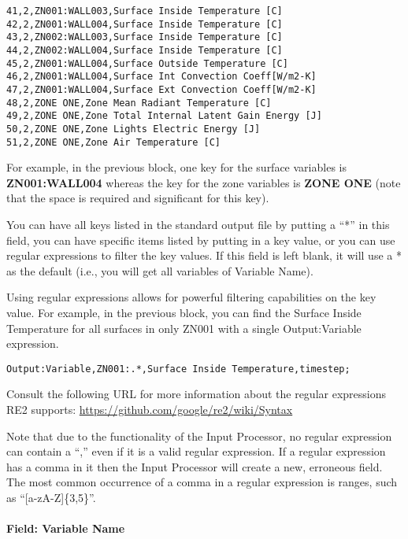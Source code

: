 \begin{lstlisting}
41,2,ZN001:WALL003,Surface Inside Temperature [C]
42,2,ZN001:WALL004,Surface Inside Temperature [C]
43,2,ZN002:WALL003,Surface Inside Temperature [C]
44,2,ZN002:WALL004,Surface Inside Temperature [C]
45,2,ZN001:WALL004,Surface Outside Temperature [C]
46,2,ZN001:WALL004,Surface Int Convection Coeff[W/m2-K]
47,2,ZN001:WALL004,Surface Ext Convection Coeff[W/m2-K]
48,2,ZONE ONE,Zone Mean Radiant Temperature [C]
49,2,ZONE ONE,Zone Total Internal Latent Gain Energy [J]
50,2,ZONE ONE,Zone Lights Electric Energy [J]
51,2,ZONE ONE,Zone Air Temperature [C]
\end{lstlisting}

For example, in the previous block, one key for the surface variables is \textbf{ZN001:WALL004} whereas the key for the zone variables is \textbf{ZONE ONE} (note that the space is required and significant for this key).

You can have all keys listed in the standard output file by putting a ``*'' in this field, you can have specific items listed by putting in a key value, or you can use regular expressions to filter the key values. If this field is left blank, it will use a * as the default (i.e., you will get all variables of Variable Name).

Using regular expressions allows for powerful filtering capabilities on the key value. For example, in the previous block, you can find the Surface Inside Temperature for all surfaces in only ZN001 with a single Output:Variable expression.

\begin{lstlisting}
Output:Variable,ZN001:.*,Surface Inside Temperature,timestep;
\end{lstlisting}

Consult the following URL for more information about the regular expressions RE2 supports: \url{https://github.com/google/re2/wiki/Syntax}

Note that due to the functionality of the Input Processor, no regular expression can contain a ``,'' even if it is a valid regular expression. If a regular expression has a comma in it then the Input Processor will create a new, erroneous field. The most common occurrence of a comma in a regular expression is ranges, such as ``[a-zA-Z]\{3,5\}''.

\paragraph{Field: Variable Name}\label{field-variable-name}

